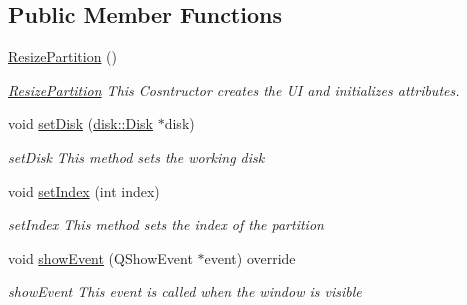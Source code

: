 \subsection*{Public Member Functions}
\begin{DoxyCompactItemize}
\item 
\mbox{\hyperlink{class_resize_partition_a05dfd7188a436d3bf6312a3335c9e4bd}{Resize\+Partition}} ()
\begin{DoxyCompactList}\small\item\em \mbox{\hyperlink{class_resize_partition}{Resize\+Partition}} This Cosntructor creates the UI and initializes attributes. \end{DoxyCompactList}\item 
void \mbox{\hyperlink{class_resize_partition_a477681a06df5266ddc7467c4083c8beb}{set\+Disk}} (\mbox{\hyperlink{classdisk_1_1_disk}{disk\+::\+Disk}} $\ast$disk)
\begin{DoxyCompactList}\small\item\em set\+Disk This method sets the working disk \end{DoxyCompactList}\item 
void \mbox{\hyperlink{class_resize_partition_a0c564d96b48c8c9b134e73184a9f591e}{set\+Index}} (int index)
\begin{DoxyCompactList}\small\item\em set\+Index This method sets the index of the partition \end{DoxyCompactList}\item 
void \mbox{\hyperlink{class_resize_partition_a3a220945008ce93de147fdf3d8faf486}{show\+Event}} (Q\+Show\+Event $\ast$event) override
\begin{DoxyCompactList}\small\item\em show\+Event This event is called when the window is visible \end{DoxyCompactList}\end{DoxyCompactItemize}
